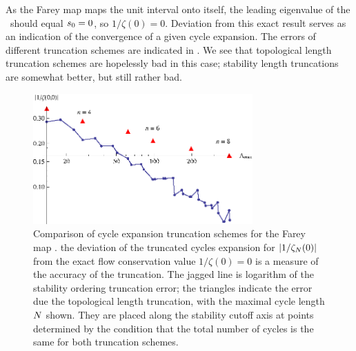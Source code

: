 As the Farey map maps the unit interval onto itself, the leading eigenvalue of
the \FPoper\ should equal $s_0=0$, so
$1/\zeta(0)=0$. Deviation from this exact result serves as an indication
of the convergence of a given cycle expansion.
The errors of different truncation
schemes are indicated in .
We see that topological length truncation schemes are hopelessly
bad in this case; stability length truncations are somewhat better,
but still rather bad.

\begin{figure} 
\begin{center}
	\includegraphics[width=0.75\textwidth]{figs/fareyZeta}
\end{center}
\caption[Cycle expansion truncation schemes for the Farey map]
        {
Comparison of cycle expansion truncation schemes for the
Farey map .
the deviation of the truncated cycles
expansion for $|1/\zeta_N(0)|$ from the exact
flow conservation value $1/\zeta(0)=0$ is a measure of the accuracy of the
truncation.  The jagged
line is logarithm of the stability ordering
truncation error; the triangles indicate the error
due the topological length truncation, with
the maximal cycle length $N$ shown.
They are placed along the stability cutoff axis at points determined
by the condition that the total number of cycles is the same for both
truncation schemes.
        }
\label{fig:logStabOrder}
\end{figure}
